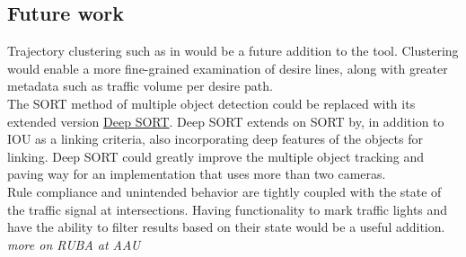 \subsection{Future work}
Trajectory clustering such as in \cite{gariel_trajectory_2011} would be a future addition to the tool.
Clustering would enable a more fine-grained examination of desire lines,
along with greater metadata such as traffic volume per desire path.
\ \\

The SORT method of multiple object detection could be replaced with its extended version \href{https://github.com/nwojke/deep_sort}{Deep SORT}.
Deep SORT extends on SORT by, in addition to IOU as a linking criteria, also incorporating
deep features of the objects for linking. Deep SORT could greatly improve the multiple object tracking
and paving way for an implementation that uses more than two cameras.
\ \\

Rule compliance and unintended behavior are tightly coupled with the state of the traffic signal at intersections. 
Having functionality to mark traffic lights and have the ability to filter results based on their state would
be a useful addition. \textit{more on RUBA at AAU}